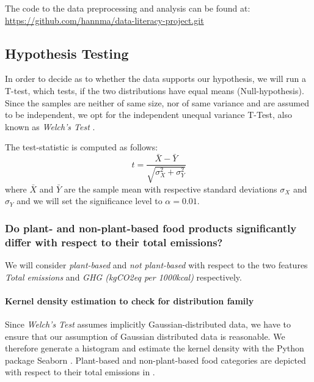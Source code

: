 \documentclass{article}
\begin{document}
The code to the data preprocessing and analysis can be found at: {\url{https://github.com/hannma/data-literacy-project.git}}

\subsection*{Hypothesis Testing}
In order  to decide as to whether the data supports our hypothesis, we will run a T-test, which tests, if the two distributions have equal means (Null-hypothesis).  Since the samples are neither of same size, nor of same variance and are assumed to be independent, we opt for the independent unequal variance T-Test, also known as \textit{Welch's Test} \cite{Welch1947}. 



The test-statistic is computed as follows:
\begin{equation}\label{eq:t-test}
  t = \frac{\bar{X}-\bar{Y}}{\sqrt{\sigma^2_{X}+\sigma^2_{Y}}}
\end{equation}
where $\bar{X}$ and  $\bar{Y}$ are the sample mean with respective standard deviations $\sigma_{X}$ and $\sigma_{Y}$ and we will set the significance level to $\alpha = 0.01$.

\subsubsection*{Do plant- and non-plant-based food products significantly differ with respect to their total emissions?}


 We will consider \textit{plant-based} and \textit{not plant-based} with respect to  the two features \textit{Total emissions} and \textit{GHG (kgCO2eq per 1000kcal)} respectively.
\paragraph*{Kernel density estimation to check for distribution family} Since \textit{Welch's Test} assumes implicitly Gaussian-distributed data, we have to ensure that our assumption of Gaussian distributed data is reasonable.  We therefore generate a histogram and estimate the kernel density with the Python package Seaborn \cite{Seaborn}. Plant-based and non-plant-based food categories are depicted with respect to their total emissions in .
\end{document}
